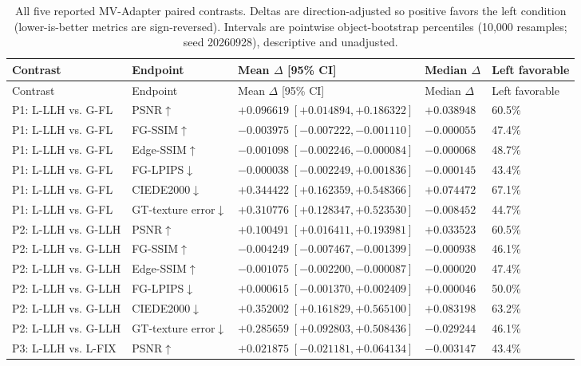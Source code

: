 \endgroup
\begingroup\scriptsize
\begin{longtable}{p{2.7cm}p{2.3cm}p{5.4cm}p{2.2cm}p{1.7cm}}
\caption{All five reported MV-Adapter paired contrasts. Deltas are direction-adjusted so positive favors the left condition (lower-is-better metrics are sign-reversed). Intervals are pointwise object-bootstrap percentiles (10,000 resamples; seed 20260928), descriptive and unadjusted.}\label{tab:mvadapter-layerwise-pairs}\\
\toprule Contrast & Endpoint & Mean $\Delta$ [95\% CI] & Median $\Delta$ & Left favorable \\
\midrule\endfirsthead
\toprule Contrast & Endpoint & Mean $\Delta$ [95\% CI] & Median $\Delta$ & Left favorable \\
\midrule\endhead
P1: L-LLH vs. G-FL & PSNR$\uparrow$ & $+0.096619\;[+0.014894,+0.186322]$ & $+0.038948$ & 60.5\% \\
P1: L-LLH vs. G-FL & FG-SSIM$\uparrow$ & $-0.003975\;[-0.007222,-0.001110]$ & $-0.000055$ & 47.4\% \\
P1: L-LLH vs. G-FL & Edge-SSIM$\uparrow$ & $-0.001098\;[-0.002246,-0.000084]$ & $-0.000068$ & 48.7\% \\
P1: L-LLH vs. G-FL & FG-LPIPS$\downarrow$ & $-0.000038\;[-0.002249,+0.001836]$ & $-0.000145$ & 43.4\% \\
P1: L-LLH vs. G-FL & CIEDE2000$\downarrow$ & $+0.344422\;[+0.162359,+0.548366]$ & $+0.074472$ & 67.1\% \\
P1: L-LLH vs. G-FL & GT-texture error$\downarrow$ & $+0.310776\;[+0.128347,+0.523530]$ & $-0.008452$ & 44.7\% \\
P2: L-LLH vs. G-LLH & PSNR$\uparrow$ & $+0.100491\;[+0.016411,+0.193981]$ & $+0.033523$ & 60.5\% \\
P2: L-LLH vs. G-LLH & FG-SSIM$\uparrow$ & $-0.004249\;[-0.007467,-0.001399]$ & $-0.000938$ & 46.1\% \\
P2: L-LLH vs. G-LLH & Edge-SSIM$\uparrow$ & $-0.001075\;[-0.002200,-0.000087]$ & $-0.000020$ & 47.4\% \\
P2: L-LLH vs. G-LLH & FG-LPIPS$\downarrow$ & $+0.000615\;[-0.001370,+0.002409]$ & $+0.000046$ & 50.0\% \\
P2: L-LLH vs. G-LLH & CIEDE2000$\downarrow$ & $+0.352002\;[+0.161829,+0.565100]$ & $+0.083198$ & 63.2\% \\
P2: L-LLH vs. G-LLH & GT-texture error$\downarrow$ & $+0.285659\;[+0.092803,+0.508436]$ & $-0.029244$ & 46.1\% \\
P3: L-LLH vs. L-FIX & PSNR$\uparrow$ & $+0.021875\;[-0.021181,+0.064134]$ & $-0.003147$ & 43.4\% \\

\end{longtable}
